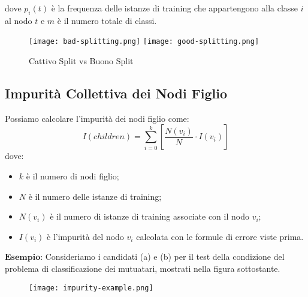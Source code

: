     dove $p_{i}(t)$ è la frequenza delle istanze di training che appartengono alla classe $i$ al nodo $t$ e $m$ è il numero totale di classi.

    \begin{figure}[h]
        \caption{Cattivo Split vs Buono Split}
        \centering
        \texttt{[image: bad-splitting.png]}
        \texttt{[image: good-splitting.png]}
    \end{figure}

    \clearpage

    \subsection{Impurità Collettiva dei Nodi Figlio}
        Possiamo calcolare l'impurità dei nodi figlio come:
            $$ I(children) = \sum_{i=0}^{k} {\left[\frac{N(v_{i})}{N} \cdot I(v_{i})\right]} $$
        dove:
        \begin{itemize}
            \item $k$ è il numero di nodi figlio;
            \item $N$ è il numero delle istanze di training;
            \item $N(v_{i})$ è il numero di istanze di training associate con il nodo $v_{i}$;
            \item $I(v_{i})$ è l'impurità del nodo $v_{i}$ calcolata con le formule di errore viste prima.
        \end{itemize}

        $\textbf{Esempio:}$ Consideriamo i candidati (a) e (b) per il test della condizione del problema di classificazione dei mutuatari, mostrati nella figura sottostante.
        \begin{figure}[h]
            \centering
            \texttt{[image: impurity-example.png]}
        \end{figure}

